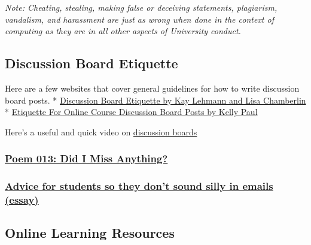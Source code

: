 \emph{Note: Cheating, stealing, making false or deceiving statements, plagiarism, vandalism, and harassment are just as wrong when done in the context of computing as they are in all other aspects of University conduct.}

\hypertarget{discussion-board-etiquette}{%
\subsection{Discussion Board Etiquette}\label{discussion-board-etiquette}}

Here are a few websites that cover general guidelines for how to write discussion board posts.
* \href{https://www2.uwstout.edu/content/profdev/rubrics/discuss_etiquette.html}{Discussion Board Etiquette by Kay Lehmann and Lisa Chamberlin}
* \href{http://learnmore.uncg.edu/blog/etiquette-for-online-course-discussion-boards}{Etiquette For Online Course Discussion Board Posts by Kelly Paul}

Here's a useful and quick video on \href{https://www.youtube.com/watch?v=tg3y2A9pdtI}{discussion boards}

\hypertarget{poem-013-did-i-miss-anything}{%
\subsubsection{\texorpdfstring{\href{https://www.loc.gov/programs/poetry-and-literature/poet-laureate/poet-laureate-projects/poetry-180/all-poems/item/poetry-180-013/did-i-miss-anything/}{Poem 013: Did I Miss Anything?}}{Poem 013: Did I Miss Anything?}}\label{poem-013-did-i-miss-anything}}

\hypertarget{advice-for-students-so-they-dont-sound-silly-in-emails-essay}{%
\subsubsection{\texorpdfstring{\href{https://www.insidehighered.com/views/2015/04/16/advice-students-so-they-dont-sound-silly-emails-essay}{Advice for students so they don't sound silly in emails (essay)}}{Advice for students so they don't sound silly in emails (essay)}}\label{advice-for-students-so-they-dont-sound-silly-in-emails-essay}}

\hypertarget{online-learning-resources}{%
\subsection{Online Learning Resources}\label{online-learning-resources}}

